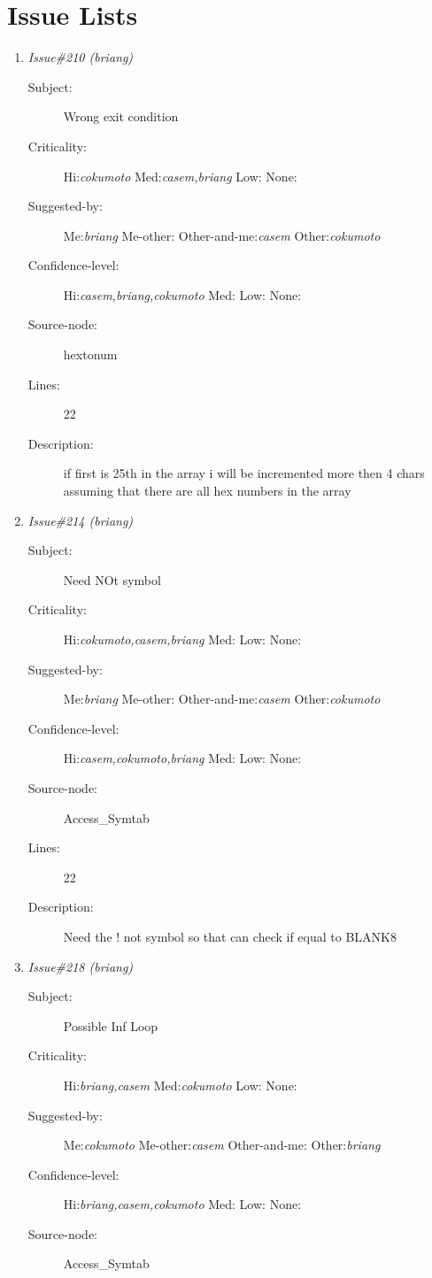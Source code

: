 \section{Issue Lists}
\begin{enumerate}
\item {\it Issue\#210 (briang)}
\begin{description}
\item [Subject:] Wrong exit condition
\item [Criticality:] Hi:{\it cokumoto} Med:{\it casem,briang} Low:{\it } None:{\it }
\item [Suggested-by:] Me:{\it briang} Me-other:{\it } Other-and-me:{\it casem} Other:{\it cokumoto}
\item [Confidence-level:] Hi:{\it casem,briang,cokumoto} Med:{\it } Low:{\it } None:{\it }
\item [Source-node:] hextonum

\item [Lines:] 22

\item [Description:] if first is 25th in the array i will be
incremented more then 4 chars assuming that there are all hex numbers in the
array
\end{description}
\item {\it Issue\#214 (briang)}
\begin{description}
\item [Subject:] Need NOt symbol
\item [Criticality:] Hi:{\it cokumoto,casem,briang} Med:{\it } Low:{\it } None:{\it }
\item [Suggested-by:] Me:{\it briang} Me-other:{\it } Other-and-me:{\it casem} Other:{\it cokumoto}
\item [Confidence-level:] Hi:{\it casem,cokumoto,briang} Med:{\it } Low:{\it } None:{\it }
\item [Source-node:] Access\_Symtab

\item [Lines:] 22

\item [Description:] Need the ! not symbol so that can check if
equal to BLANK8
\end{description}
\item {\it Issue\#218 (briang)}
\begin{description}
\item [Subject:] Possible Inf Loop
\item [Criticality:] Hi:{\it briang,casem} Med:{\it cokumoto} Low:{\it } None:{\it }
\item [Suggested-by:] Me:{\it cokumoto} Me-other:{\it casem} Other-and-me:{\it } Other:{\it briang}
\item [Confidence-level:] Hi:{\it briang,casem,cokumoto} Med:{\it } Low:{\it } None:{\it }
\item [Source-node:] Access\_Symtab


\end{description}
\end{enumerate}
